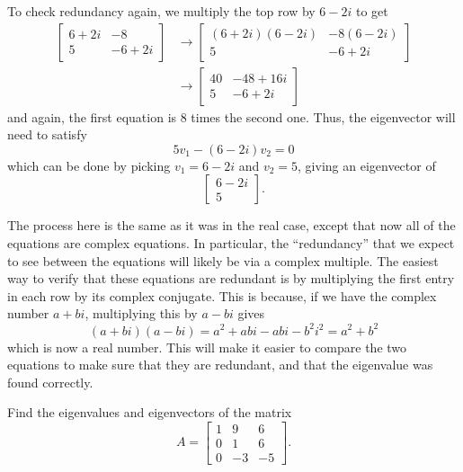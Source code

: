 \documentclass{ximera}
\begin{document}
\begin{exampleSol}
To check redundancy again, we multiply the top row by $6-2i$ to get  
\[ 
    \begin{split}
        \begin{bmatrix} 
            6+2i & -8 \\ 
            5 & -6+2i 
        \end{bmatrix} 
        &\rightarrow  
        \begin{bmatrix} 
            (6+2i)(6-2i) & -8(6-2i) \\ 
            5 & -6+2i 
        \end{bmatrix} \\
        &\rightarrow 
        \begin{bmatrix} 
            40 & -48 + 16i \\ 
            5 & -6+2i 
        \end{bmatrix}
    \end{split} 
\] 
and again, the first equation is 8 times the second one. Thus, the eigenvector will need to satisfy 
\[ 
    5v_1 - (6 - 2i)v_2 = 0
\] 
which can be done by picking $v_1 = 6-2i$ and $v_2 = 5$, giving an eigenvector of
\[ 
    \begin{bmatrix} 
        6-2i \\ 
        5 
    \end{bmatrix}. 
\]
\end{exampleSol}

The process here is the same as it was in the real case, except that now all of the equations are complex equations. In particular, the ``redundancy'' that we expect to see between the equations will likely be via a complex multiple. The easiest way to verify that these equations are redundant is by multiplying the first entry in each row by its complex conjugate. This is because, if we have the complex number $a + bi$, multiplying this by $a-bi$ gives
\[ 
    (a+bi)(a-bi) = a^2 + abi - abi - b^2i^2 = a^2 + b^2 
\] 
which is now a real number. This will make it easier to compare the two equations to make sure that they are redundant, and that the eigenvalue was found correctly.

\begin{example}
    Find the eigenvalues and eigenvectors of the matrix
    \[ 
        A = 
        \begin{bmatrix} 
            1 & 9 & 6 \\ 
            0 & 1 & 6 \\ 
            0 & -3 & -5 
        \end{bmatrix}.
    \]
\end{example}
\end{document}

